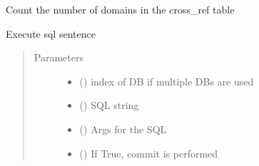 \documentclass[letterpaper,10pt,english]{sphinxmanual}
\begin{document}
\begin{fulllineitems}

\begin{fulllineitems}
\label{\detokenize{bbc1.core.data_handler:bbc1.core.data_handler.DataHandler.RESPONSE_SEARCH}}
\end{fulllineitems}


\begin{fulllineitems}
\label{\detokenize{bbc1.core.data_handler:bbc1.core.data_handler.DataHandler.count_domain_in_cross_ref}}
Count the number of domains in the cross\_ref table

\end{fulllineitems}


\begin{fulllineitems}
\label{\detokenize{bbc1.core.data_handler:bbc1.core.data_handler.DataHandler.exec_sql}}
Execute sql sentence
\begin{quote}\begin{description}
\item[{Parameters}] \leavevmode\begin{itemize}
\item {} 
 () \textendash{} index of DB if multiple DBs are used

\item {} 
 () \textendash{} SQL string

\item {} 
 () \textendash{} Args for the SQL

\item {} 
 () \textendash{} If True, commit is performed


\end{itemize}
\end{description}
\end{quote}
\end{fulllineitems}
\end{fulllineitems}
\end{document}
